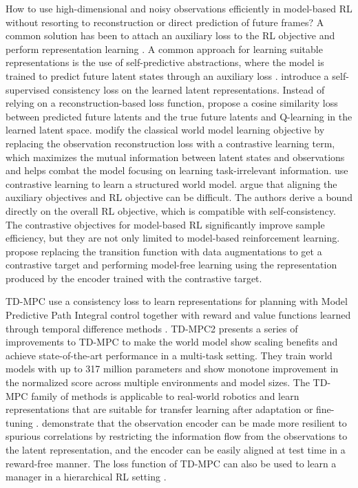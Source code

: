 \documentclass{article}
\theoremstyle{plain}
\theoremstyle{definition}
\theoremstyle{remark}
\begin{document}
How to use high-dimensional and noisy observations efficiently in model-based RL without resorting to reconstruction or direct prediction of future frames? A common solution has been to attach an auxiliary loss to the RL objective and perform representation learning \cite{tomar2021learning, ni2024bridging}. A common approach for learning suitable representations is the use of self-predictive abstractions, where the model is trained to predict future latent states through an auxiliary loss \cite{subramanian2022approximate}. \citet{ye2021mastering} introduce a self-supervised consistency loss on the learned latent representations. Instead of relying on a reconstruction-based loss function, \citet{schwarzer2020data} propose a cosine similarity loss between predicted future latents and the true future latents and Q-learning in the learned latent space. \citet{ma2021contrastive} modify the classical world model learning objective by replacing the observation reconstruction loss with a contrastive learning term, which maximizes the mutual information between latent states and observations and helps combat the model focusing on learning task-irrelevant information. \citet{kipf2019contrastive} use contrastive learning to learn a structured world model. \citet{ghugare2022simplifying} argue that aligning the auxiliary objectives and RL objective can be difficult. The authors derive a bound directly on the overall RL objective, which is compatible with self-consistency. The contrastive objectives for model-based RL significantly improve sample efficiency, but they are not only limited to model-based reinforcement learning. \citet{laskinCURLContrastiveUnsupervised2020} propose replacing the transition function with data augmentations to get a contrastive target and performing model-free learning using the representation produced by the encoder trained with the contrastive target.

TD-MPC \cite{hansenTemporalDifferenceLearning2022} use a consistency loss to learn representations for planning with Model Predictive Path Integral control together with reward and value functions learned through temporal difference methods \cite{williams2015model}. TD-MPC2 \cite{hansen2023td} presents a series of improvements to TD-MPC to make the world model show scaling benefits and achieve state-of-the-art performance in a multi-task setting. They train world models with up to 317 million parameters and show monotone improvement in the normalized score across multiple environments and model sizes. The TD-MPC family of methods is applicable to real-world robotics \cite{lancaster2023modem} and learn representations that are suitable for transfer learning after adaptation \cite{yang2023movie} or fine-tuning \cite{feng2023finetuning}. \citet{zhu2023repo} demonstrate that the observation encoder can be made more resilient to spurious correlations by restricting the information flow from the observations to the latent representation, and the encoder can be easily aligned at test time in a reward-free manner. The loss function of TD-MPC can also be used to learn a manager in a hierarchical RL setting \cite{chitnis2023iql}.
\end{document}
